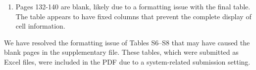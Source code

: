 \documentclass[
  12pt,
  letterpaper,
  DIV=11,
  numbers=noendperiod]{scrartcl}
\providecommand{\tightlist}{%
  \setlength{\itemsep}{0pt}\setlength{\parskip}{0pt}}\usepackage{longtable,booktabs,array}
\renewenvironment{quote}
  {\begin{customblockquote}\color{blockquote-text}\ignorespaces}
  {\end{customblockquote}}
\begin{document}
\begin{quote}
\begin{enumerate}
\def\labelenumi{\arabic{enumi})}
\setcounter{enumi}{4}
\tightlist
\item
  Pages 132-140 are blank, likely due to a formatting issue with the
  final table. The table appears to have fixed columns that prevent the
  complete display of cell information.
\end{enumerate}
\end{quote}

We have resolved the formatting issue of Tables S6--S8 that may have
caused the blank pages in the supplementary file. These tables, which
were submitted as Excel files, were included in the PDF due to a
system-related submission setting.
\end{document}
